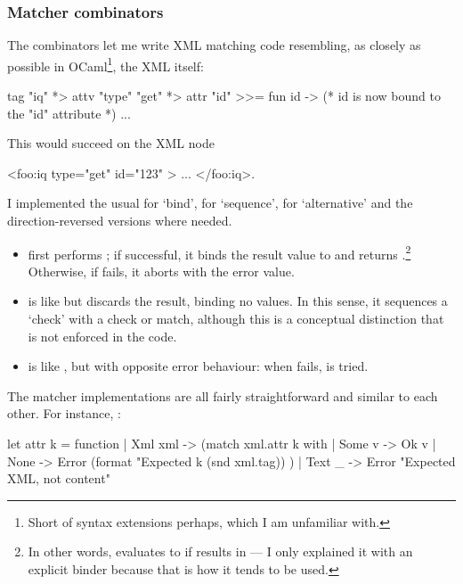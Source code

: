 \subsubsection{Matcher combinators}
The combinators let me write XML matching code resembling, as closely as possible in OCaml\footnote{Short of syntax extensions perhaps, which I am unfamiliar with.}, the XML itself:

\begin{ocaml}
tag "iq" *> attv "type" "get" *> attr "id" >>= fun id ->
  (* id is now bound to the "id" attribute *)
  ...
\end{ocaml}

This would succeed on the XML node
\begin{xml}
<foo:iq type="get" id="123" > ... </foo:iq>.
\end{xml}

I implemented the usual \code{>>=} for `bind', \code{*>} for `sequence', \code{<|>} for `alternative' and the direction-reversed versions where needed.

\begin{itemize}
  \item {} first performs ; if successful, it binds the result value to  and returns .\footnote{In other words,  evaluates to  if  results in  --- I only explained it with an explicit binder because that is how it tends to be used.} Otherwise, if  fails, it aborts with the error value.

  \item {} is like \code{>>=} but discards the result, binding no values. In this sense, it sequences a `check' with a check or match, although this is a conceptual distinction that is not enforced in the code.

  \item {} is like \code{*>}, but with opposite error behaviour: when  fails,  is tried.
\end{itemize}

The matcher implementations are all fairly straightforward and similar to each other. For instance, :

\begin{ocaml}
let attr k = function
  | Xml xml -> (match xml.attr k with
    | Some v -> Ok v
    | None -> Error (format
        "Expected %
          k (snd xml.tag)) )
  | Text _ -> Error "Expected XML, not content"
\end{ocaml}

